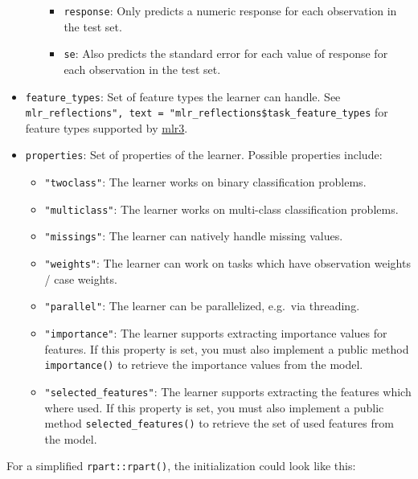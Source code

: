 \documentclass[
  11pt,
  parskip=half,
  DIV=calc,
  BCOR=10mm,
  x11names]{scrbook}
\providecommand{\tightlist}{%
  \setlength{\itemsep}{0pt}\setlength{\parskip}{0pt}}
\begin{document}
\begin{itemize}
\begin{itemize}
    \begin{itemize}
    \tightlist
    \item
      \texttt{response}: Only predicts a numeric response for each observation in the test set.
    \item
      \texttt{se}: Also predicts the standard error for each value of response for each observation in the test set.
    \end{itemize}
  \end{itemize}
\item
  \texttt{feature\_types}: Set of feature types the learner can handle.
  See \texttt{mlr\_reflections",\ text\ =\ "mlr\_reflections\$task\_feature\_types} for feature types supported by \href{https://mlr3.mlr-org.com}{mlr3}.
\item
  \texttt{properties}: Set of properties of the learner. Possible properties include:

  \begin{itemize}
  \tightlist
  \item
    \texttt{"twoclass"}: The learner works on binary classification problems.
  \item
    \texttt{"multiclass"}: The learner works on multi-class classification problems.
  \item
    \texttt{"missings"}: The learner can natively handle missing values.
  \item
    \texttt{"weights"}: The learner can work on tasks which have observation weights / case weights.
  \item
    \texttt{"parallel"}: The learner can be parallelized, e.g.~via threading.
  \item
    \texttt{"importance"}: The learner supports extracting importance values for features.
    If this property is set, you must also implement a public method \texttt{importance()} to retrieve the importance values from the model.
  \item
    \texttt{"selected\_features"}: The learner supports extracting the features which where used.
    If this property is set, you must also implement a public method \texttt{selected\_features()} to retrieve the set of used features from the model.
  \end{itemize}
\end{itemize}

For a simplified \texttt{rpart::rpart()}, the initialization could look like this:
\end{document}
